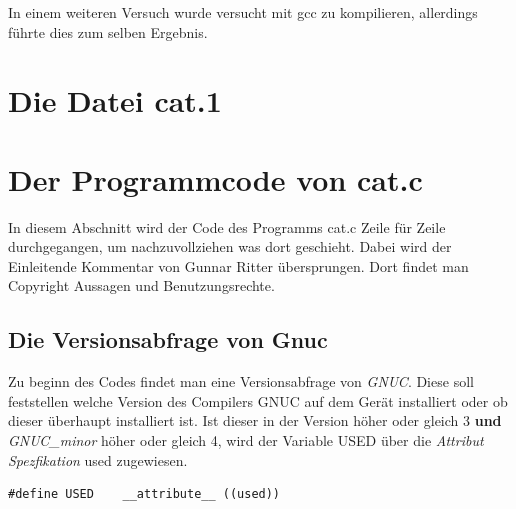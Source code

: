In einem weiteren Versuch wurde versucht mit gcc zu kompilieren, allerdings führte dies zum selben Ergebnis.

\section{Die Datei cat.1}

\section{Der Programmcode von cat.c}
In diesem Abschnitt wird der Code des Programms cat.c Zeile für Zeile durchgegangen, um nachzuvollziehen was dort geschieht. Dabei wird der Einleitende Kommentar von Gunnar Ritter übersprungen. Dort findet man Copyright Aussagen und Benutzungsrechte.

\subsection{Die Versionsabfrage von Gnuc}
Zu beginn des Codes findet man eine Versionsabfrage von \textit{GNUC}. Diese soll feststellen welche Version des Compilers GNUC auf dem Gerät installiert oder ob dieser überhaupt installiert ist. Ist dieser in der Version höher oder gleich 3 \textbf{und} \textit{GNUC\_minor} höher oder gleich 4, wird der Variable USED über die \textit{Attribut Spezfikation} used zugewiesen.

\begin{lstlisting}
#define USED	__attribute__ ((used))
\end{lstlisting}


